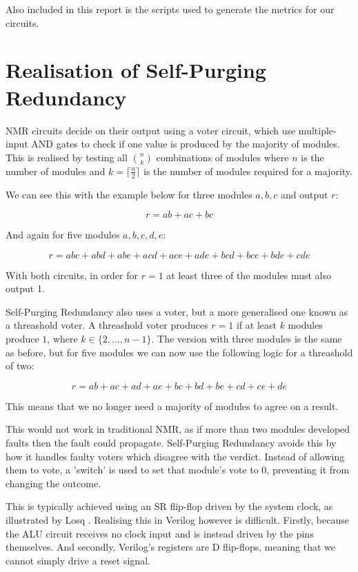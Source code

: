\documentclass[a4paper,12pt]{article}
\begin{document}
    Also included in this report is the scripts used to generate the metrics for our circuits.

    \section{Realisation of Self-Purging Redundancy}
    NMR circuits decide on their output using a voter circuit, which use multiple-input AND gates to check if one value is produced by the majority of modules. This is realised by testing all ${n \choose k}$ combinations of modules where $n$ is the number of modules and $k = \lceil\frac{n}{2}\rceil$ is the number of modules required for a majority.

    We can see this with the example below for three modules $a, b, c$ and output $r$:

    $$r = ab + ac + bc$$

    And again for five modules $a, b, c, d, e$:

    $$r = abc + abd + abe + acd + ace + ade + bcd + bce + bde + cde$$

    With both circuits, in order for $r = 1$ at least three of the modules must also output 1.

    Self-Purging Redundancy also uses a voter, but a more generalised one known as a threashold voter. A threashold voter produces $r = 1$ if at least $k$ modules produce $1$, where $k \in \{2,...,n-1\}$. The version with three modules is the same as before, but for five modules we can now use the following logic for a threashold of two:

    $$r = ab + ac + ad + ae + bc + bd + be + cd + ce + de$$

    This means that we no longer need a majority of modules to agree on a result.

    This would not work in traditional NMR, as if more than two modules developed faults then the fault could propagate. Self-Purging Redundancy avoids this by how it handles faulty voters which disagree with the verdict. Instead of allowing them to vote, a 'switch' is used to set that module's vote to $0$, preventing it from changing the outcome.

    This is typically achieved using an SR flip-flop driven by the system clock, as illustrated by Losq \cite[Section 2-B]{1674656}. Realising this in Verilog however is difficult. Firstly, because the ALU circuit receives no clock input and is instead driven by the pins themselves. And secondly, Verilog's registers are D flip-flops, meaning that we cannot simply drive a reset signal.
\end{document}
